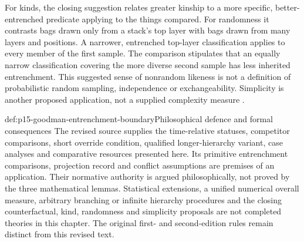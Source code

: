 For kinds, the closing suggestion relates greater kinship to a more
specific, better-entrenched predicate applying to the things compared.
For randomness it contrasts bags drawn only from a stack's top layer with
bags drawn from many layers and positions. A narrower, entrenched top-layer
classification applies to every member of the first sample. The comparison
stipulates that an equally narrow classification covering the more diverse
second sample has less inherited entrenchment. This suggested
sense of nonrandom likeness is not a definition of probabilistic random
sampling, independence or exchangeability. Simplicity is another proposed
application, not a supplied complexity measure
\parencite[pp.~122--124]{Goodman1983FourthProjection}.

\begin{proofboundary}{def:p15-goodman-entrenchment-boundary}{Philosophical defence and formal consequences}
The revised source supplies the time-relative statuses, competitor
comparisons, short override condition, qualified longer-hierarchy variant,
case analyses and comparative resources presented here. Its primitive
entrenchment comparisons, projection record and conflict assumptions are
premises of an application. Their normative authority is argued
philosophically, not proved by the three mathematical lemmas. Statistical
extensions, a unified numerical overall measure, arbitrary branching or
infinite hierarchy procedures and the closing counterfactual, kind,
randomness and simplicity proposals are not completed theories in this
chapter. The original first- and second-edition rules remain distinct
from this revised text.
\end{proofboundary}
